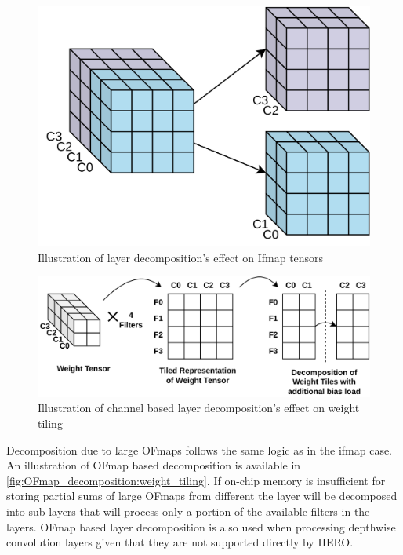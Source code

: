 \begin{figure}[ht]
    \centering
    \includegraphics[scale=0.25]{fig/ifmap_decomposition.pdf}
    \caption{Illustration of layer decomposition's effect on Ifmap tensors}
    \label{fig:ifmap_decomposition}
\end{figure}


\begin{figure}[ht]
    \centering
    \includegraphics[scale=0.4]{fig/ifmap_decomposition_tiling_repr.pdf}
    \caption{Illustration of channel based layer decomposition's effect on weight tiling}
    \label{fig:ifmap_decomposition:weight_tiling}
\end{figure}

Decomposition due to large OFmaps follows the same logic as in the ifmap case.
An illustration of OFmap based decomposition is available in
\autoref{fig:OFmap_decomposition:weight_tiling}. If on-chip memory is
insufficient for storing partial sums of large OFmaps from different the layer will be
decomposed into sub layers that will process only a portion of the available
filters in the layers. OFmap based layer decomposition is also used when
processing depthwise convolution layers given that they are not supported
directly by HERO.  

